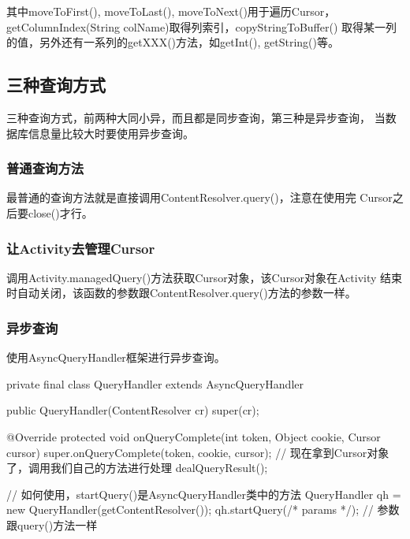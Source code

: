 ﻿\documentclass[a4paper,11pt]{article}
\begin{document}
其中moveToFirst(), moveToLast(), moveToNext()用于遍历Cursor，
getColumnIndex(String colName)取得列索引，copyStringToBuffer()
取得某一列的值，另外还有一系列的getXXX()方法，如getInt(), getString()等。

\subsection[三种查询方式]{三种查询方式}
三种查询方式，前两种大同小异，而且都是同步查询，第三种是异步查询，
当数据库信息量比较大时要使用异步查询。

\subsubsection[普通查询方法]{普通查询方法}
最普通的查询方法就是直接调用ContentResolver.query()，注意在使用完
Cursor之后要close()才行。

\subsubsection[让Activity去管理Cursor]{让Activity去管理Cursor}
调用Activity.managedQuery()方法获取Cursor对象，该Cursor对象在Activity
结束时自动关闭，该函数的参数跟ContentResolver.query()方法的参数一样。

\subsubsection[异步查询]{异步查询}
使用AsyncQueryHandler框架进行异步查询。

\begin{javacode}
private final class QueryHandler extends AsyncQueryHandler {  
    public QueryHandler(ContentResolver cr) {  
        super(cr);  
    }  
  
    @Override  
    protected void onQueryComplete(int token, Object cookie, Cursor cursor) {  
        super.onQueryComplete(token, cookie, cursor);  
        // 现在拿到Cursor对象了，调用我们自己的方法进行处理
        dealQueryResult();
    }  
}

// 如何使用，startQuery()是AsyncQueryHandler类中的方法
QueryHandler qh = new QueryHandler(getContentResolver());
qh.startQuery(/* params */); // 参数跟query()方法一样
\end{javacode}
\end{document}
